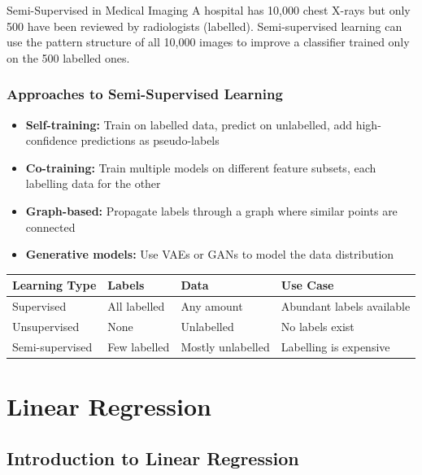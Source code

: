 \documentclass[12pt,a4paper]{report}
\begin{document}
\begin{examplebox}{Semi-Supervised in Medical Imaging}
A hospital has 10,000 chest X-rays but only 500 have been reviewed by radiologists (labelled). Semi-supervised learning can use the pattern structure of all 10,000 images to improve a classifier trained only on the 500 labelled ones.
\end{examplebox}

\subsection{Approaches to Semi-Supervised Learning}

\begin{itemize}[noitemsep]
  \item \textbf{Self-training:} Train on labelled data, predict on unlabelled, add high-confidence predictions as pseudo-labels
  \item \textbf{Co-training:} Train multiple models on different feature subsets, each labelling data for the other
  \item \textbf{Graph-based:} Propagate labels through a graph where similar points are connected
  \item \textbf{Generative models:} Use VAEs or GANs to model the data distribution
\end{itemize}

\begin{center}
\begin{tabular}{llll}
\toprule
\textbf{Learning Type} & \textbf{Labels} & \textbf{Data} & \textbf{Use Case} \\
\midrule
Supervised & All labelled & Any amount & Abundant labels available \\
Unsupervised & None & Unlabelled & No labels exist \\
Semi-supervised & Few labelled & Mostly unlabelled & Labelling is expensive \\
\bottomrule
\end{tabular}
\end{center}

\chapter{Linear Regression}

\section{Introduction to Linear Regression}
\end{document}
